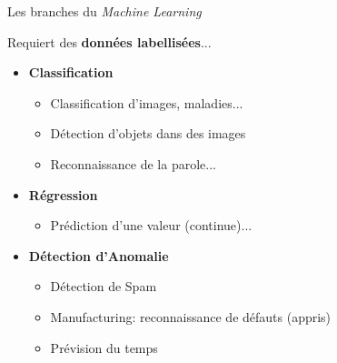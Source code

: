 \documentclass[10pt,serif,mathserif,compress,hyperref={colorlinks}]{beamer}
\begin{document}
\begin{frame}{Les branches du {\em Machine Learning}}

  \begin{tcolorbox}[title={\em Supervised learning}\\Apprentissage supervisé]
  Requiert des {\bf données labellisées}...
    \begin{itemize}
    \item \textbf{Classification}
      \begin{itemize}
      \item Classification d'images, maladies...
      \item Détection d'objets dans des images
      \item Reconnaissance de la parole...
      \end{itemize}
    \item \textbf{Régression}
      \begin{itemize}
      \item Prédiction d'une valeur (continue)...
      \end{itemize}
    \item \textbf{Détection d'Anomalie}
      \begin{itemize}
      \item Détection de Spam
      \item Manufacturing: reconnaissance de défauts (appris)
      \item Prévision du temps
      \end{itemize}        
    \end{itemize}
  \end{tcolorbox}
\end{frame}
\end{document}
